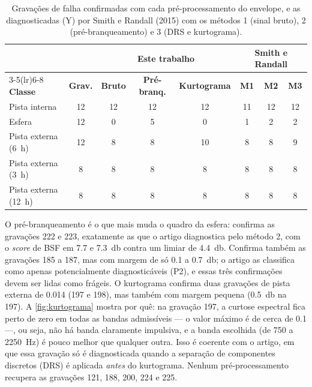 \begin{table}[htb]
  \centering
  \caption{Gravações de falha confirmadas com cada pré-processamento do envelope,
  e as diagnosticadas (Y) por Smith e Randall (2015) com os métodos 1 (sinal
  bruto), 2 (pré-branqueamento) e 3 (DRS e kurtograma).}
  \label{tab:preprocessamentos}
  \footnotesize
  \begin{tabular}{lccccccc}
    \toprule
    & & \multicolumn{3}{c}{\textbf{Este trabalho}} & \multicolumn{3}{c}{\textbf{Smith e Randall}} \\
    \cmidrule(lr){3-5}\cmidrule(lr){6-8}
    \textbf{Classe} & \textbf{Grav.} & \textbf{Bruto} & \textbf{Pré-branq.} &
    \textbf{Kurtograma} & \textbf{M1} & \textbf{M2} & \textbf{M3} \\
    \midrule
    Pista interna        & 12 & 12 & 12 & 12 & 11 & 12 & 12 \\
    Esfera               & 12 & 0  & 5  & 0  & 1  & 2  & 2  \\
    Pista externa (6~h)  & 12 & 8  & 8  & 10 & 8  & 8  & 9  \\
    Pista externa (3~h)  & 8  & 8  & 8  & 8  & 8  & 8  & 8  \\
    Pista externa (12~h) & 8  & 8  & 8  & 8  & 8  & 8  & 8  \\
    \bottomrule
  \end{tabular}
\end{table}

O pré-branqueamento é o que mais muda o quadro da esfera: confirma as gravações
222 e 223, exatamente as que o artigo diagnostica pelo método 2, com o \emph{score} de
BSF em \num{7.7} e \SI{7.3}{\decibel} contra um limiar de \SI{4.4}{\decibel}.
Confirma também as gravações 185 a 187, mas com margem de só \num{0.1} a
\SI{0.7}{\decibel}; o artigo as classifica como apenas potencialmente
diagnosticáveis (P2), e essas três confirmações devem ser lidas como frágeis.
O kurtograma confirma duas gravações de pista externa de \SI{0.014}{\inch} (197 e
198), mas também com margem pequena (\SI{0.5}{\decibel} na 197). A
\autoref{fig:kurtograma} mostra por quê: na gravação 197, a curtose espectral
fica perto de zero em todas as bandas admissíveis --- o valor máximo é de
cerca de \num{0.1} ---, ou seja, não há banda claramente impulsiva, e a banda
escolhida (de 750 a \SI{2250}{\hertz}) é pouco melhor que qualquer outra. Isso
é coerente com o artigo, em que essa gravação só é diagnosticada quando a
separação de componentes discretos (DRS) é aplicada \emph{antes} do kurtograma.
Nenhum pré-processamento recupera as gravações 121, 188, 200, 224 e 225.

